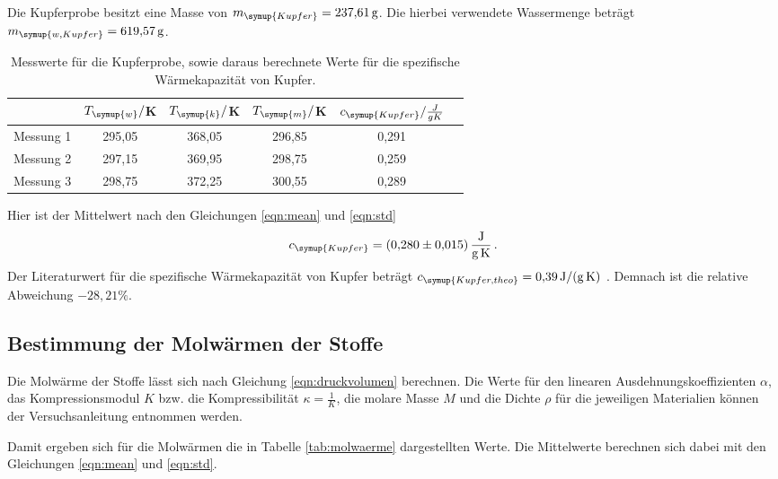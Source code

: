 Die Kupferprobe besitzt eine Masse von $m_{\symup{Kupfer}}=\SI{237.61}{\gram}$.
Die hierbei verwendete Wassermenge beträgt $m_{\symup{w,Kupfer}}=\SI{619.57}{\gram}$.

\begin{table}
  \centering
  \caption{Messwerte für die Kupferprobe, sowie daraus berechnete Werte für die spezifische
  Wärmekapazität von Kupfer.}
  \label{tab:kupfer}
  \begin{tabular}{c c c c c c}
    \toprule
    & $T_{\symup{w}}/$K & $T_{\symup{k}}/$K & $T_{\symup{m}}/$K & $c_{\symup{Kupfer}}/\frac{J}{g K}$ \\
    \midrule
    Messung 1 & 295,05 & 368,05 & 296,85 & 0,291 \\
    Messung 2 & 297,15 & 369,95 & 298,75 & 0,259 \\
    Messung 3 & 298,75 & 372,25 & 300,55 & 0,289 \\
    \bottomrule
  \end{tabular}
\end{table}

Hier ist der Mittelwert nach den Gleichungen \eqref{eqn:mean} und
\eqref{eqn:std}
\begin{equation}
  c_{\symup{Kupfer}} = \SI{0.280(0015)}{\joule\per\gram\per\kelvin} \,.\nonumber
\end{equation}
Der Literaturwert für die spezifische Wärmekapazität von Kupfer beträgt
$c_{\symup{Kupfer,theo}}=\SI{0.39}{\joule\per\gram\per\kelvin}$ \cite{werte}.
Demnach ist die relative Abweichung $-28,21\%$.


\subsection{Bestimmung der Molwärmen der Stoffe}
\label{sec:molwaerme}

Die Molwärme der Stoffe lässt sich nach Gleichung \eqref{eqn:druckvolumen}
berechnen. Die Werte für den linearen Ausdehnungskoeffizienten $\alpha$,
das Kompressionsmodul $K$ bzw. die Kompressibilität $\kappa=\frac{1}{K}$, die molare Masse $M$ und die Dichte $\rho$
für die jeweiligen Materialien können der Versuchsanleitung \cite{Versuchsanleitung}
entnommen werden.

Damit ergeben sich für die Molwärmen die in Tabelle \ref{tab:molwaerme} dargestellten Werte.
Die Mittelwerte berechnen sich dabei mit den Gleichungen \eqref{eqn:mean} und
\eqref{eqn:std}.

